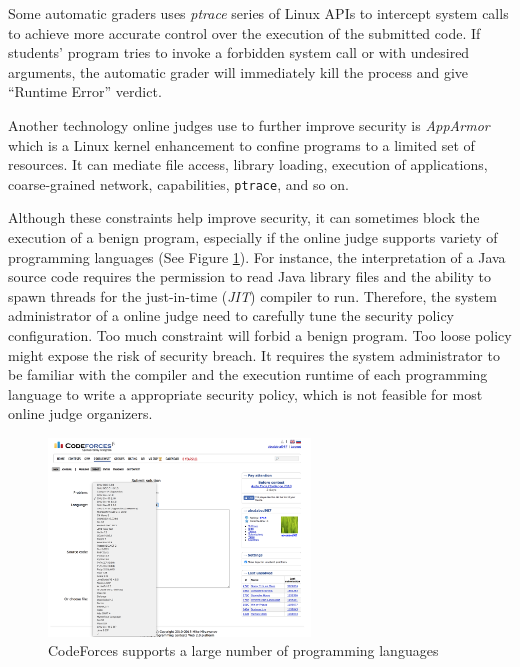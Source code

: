             Some automatic graders uses \emph{ptrace} series of Linux APIs to intercept system calls to
            achieve more accurate control over the execution of the submitted code.
            If students' program tries to invoke a forbidden system call or with undesired arguments,
            the automatic grader will immediately kill the process and give ``Runtime Error'' verdict.

            Another technology online judges use to further improve security is \emph{AppArmor} \cite{apparmor}
            which is a Linux kernel enhancement to confine programs to a limited set of resources.
            It can mediate file access, library loading, execution of applications, coarse-grained network,
            capabilities, \texttt{ptrace}, and so on.

            Although these constraints help improve security,
            it can sometimes block the execution of a benign program,
            especially if the online judge supports variety of programming languages (See Figure \ref{fig:codeforces-languages}).
            For instance, the interpretation of a Java source code requires the permission to read
            Java library files and the ability to spawn threads for the just-in-time (\emph{JIT}) compiler to run.
            Therefore, the system administrator of a online judge need to carefully tune the security policy configuration.
            Too much constraint will forbid a benign program.
            Too loose policy might expose the risk of security breach.
            It requires the system administrator to be familiar with the compiler and the execution runtime
            of each programming language to write a appropriate security policy,
            which is not feasible for most online judge organizers.
            \begin{figure}[htp]
                \centering
                \includegraphics[width=0.62\textwidth]{img/codeforces-languages.png}
                \caption{CodeForces supports a large number of programming languages}
                \label{fig:codeforces-languages}
            \end{figure}

